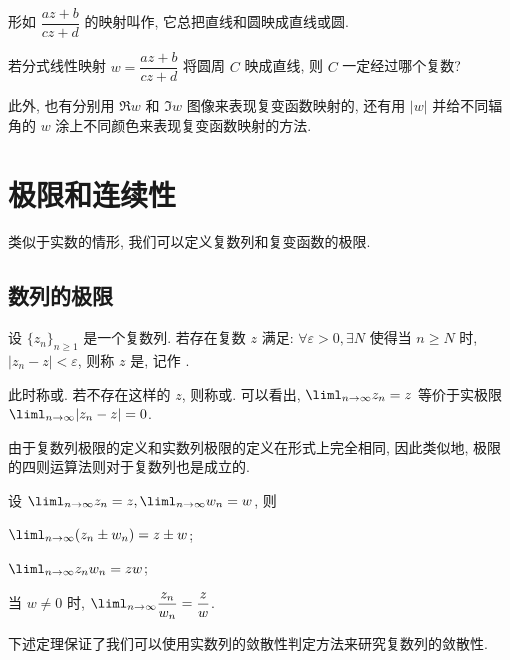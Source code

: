 形如 $\dfrac{az+b}{cz+d}$ 的映射叫作, 它总把直线和圆映成直线或圆.

\begin{exercise}
  若分式线性映射 $w=\dfrac{az+b}{cz+d}$ 将圆周 $C$ 映成直线, 则 $C$ 一定经过哪个复数?
\end{exercise}

此外, 也有分别用 $\Re w$ 和 $\Im w$ 图像来表现复变函数映射的, 还有用 $|w|$ 并给不同辐角的 $w$ 涂上不同颜色来表现复变函数映射的方法.



\section{极限和连续性}

类似于实数的情形, 我们可以定义复数列和复变函数的极限.

\subsection{数列的极限}

\begin{definition}
  设 $\{z_n\}_{n\ge 1}$ 是一个复数列.
  若存在复数 $z$ 满足: $\forall \varepsilon>0,\exists N$ 使得当 $n\ge N$ 时, $|z_n-z|<\varepsilon$, 则称 $z$ 是, 记作 .
\end{definition}
此时称或.
若不存在这样的 $z$, 则称或.
可以看出, $\liml_{n\ra\infty}z_n=z$ 等价于实极限 $\liml_{n\ra\infty}|z_n-z|=0$.

由于复数列极限的定义和实数列极限的定义在形式上完全相同, 因此类似地, 极限的四则运算法则对于复数列也是成立的.

\begin{theorem}
  设 $\liml_{n\ra\infty}z_n=z,\liml_{n\ra\infty}w_n=w$, 则
  \begin{enuma}
    \item $\liml_{n\ra\infty}(z_n\pm w_n)=z\pm w$;
    \item $\liml_{n\ra\infty} z_nw_n=zw$;
    \item 当 $w\neq 0$ 时, $\liml_{n\ra\infty}\dfrac{z_n}{w_n}=\dfrac zw$.
  \end{enuma}
\end{theorem}

下述定理保证了我们可以使用实数列的敛散性判定方法来研究复数列的敛散性.


